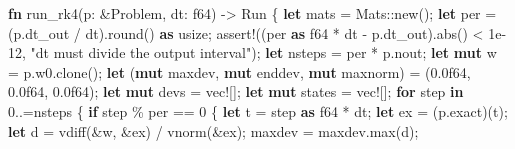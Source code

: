 \documentclass[
  10pt,
]{article}
\newenvironment{Shaded}{}{}
\newcommand{\ControlFlowTok}[1]{\textcolor[rgb]{0.00,0.44,0.13}{\textbf{#1}}}
\newcommand{\DataTypeTok}[1]{\textcolor[rgb]{0.56,0.13,0.00}{#1}}
\newcommand{\DecValTok}[1]{\textcolor[rgb]{0.25,0.63,0.44}{#1}}
\newcommand{\KeywordTok}[1]{\textcolor[rgb]{0.00,0.44,0.13}{\textbf{#1}}}
\newcommand{\NormalTok}[1]{#1}
\newcommand{\OperatorTok}[1]{\textcolor[rgb]{0.40,0.40,0.40}{#1}}
\newcommand{\PreprocessorTok}[1]{\textcolor[rgb]{0.74,0.48,0.00}{#1}}
\newcommand{\StringTok}[1]{\textcolor[rgb]{0.25,0.44,0.63}{#1}}
\begin{document}
\begin{Shaded}
\begin{Highlighting}[]
\KeywordTok{fn}\NormalTok{ run\_rk4(p}\OperatorTok{:} \OperatorTok{\&}\NormalTok{Problem}\OperatorTok{,}\NormalTok{ dt}\OperatorTok{:} \DataTypeTok{f64}\NormalTok{) }\OperatorTok{{-}\textgreater{}}\NormalTok{ Run }\OperatorTok{\{}
    \KeywordTok{let}\NormalTok{ mats }\OperatorTok{=} \PreprocessorTok{Mats::}\NormalTok{new()}\OperatorTok{;}
    \KeywordTok{let}\NormalTok{ per }\OperatorTok{=}\NormalTok{ (p}\OperatorTok{.}\NormalTok{dt\_out }\OperatorTok{/}\NormalTok{ dt)}\OperatorTok{.}\NormalTok{round() }\KeywordTok{as} \DataTypeTok{usize}\OperatorTok{;}
    \PreprocessorTok{assert!}\NormalTok{((per }\KeywordTok{as} \DataTypeTok{f64} \OperatorTok{*}\NormalTok{ dt }\OperatorTok{{-}}\NormalTok{ p}\OperatorTok{.}\NormalTok{dt\_out)}\OperatorTok{.}\NormalTok{abs() }\OperatorTok{\textless{}} \DecValTok{1e{-}12}\OperatorTok{,} \StringTok{"dt must divide the output interval"}\NormalTok{)}\OperatorTok{;}
    \KeywordTok{let}\NormalTok{ nsteps }\OperatorTok{=}\NormalTok{ per }\OperatorTok{*}\NormalTok{ p}\OperatorTok{.}\NormalTok{nout}\OperatorTok{;}
    \KeywordTok{let} \KeywordTok{mut}\NormalTok{ w }\OperatorTok{=}\NormalTok{ p}\OperatorTok{.}\NormalTok{w0}\OperatorTok{.}\NormalTok{clone()}\OperatorTok{;}
    \KeywordTok{let}\NormalTok{ (}\KeywordTok{mut}\NormalTok{ maxdev}\OperatorTok{,} \KeywordTok{mut}\NormalTok{ enddev}\OperatorTok{,} \KeywordTok{mut}\NormalTok{ maxnorm) }\OperatorTok{=}\NormalTok{ (}\DecValTok{0.0f64}\OperatorTok{,} \DecValTok{0.0f64}\OperatorTok{,} \DecValTok{0.0f64}\NormalTok{)}\OperatorTok{;}
    \KeywordTok{let} \KeywordTok{mut}\NormalTok{ devs }\OperatorTok{=} \PreprocessorTok{vec!}\NormalTok{[]}\OperatorTok{;}
    \KeywordTok{let} \KeywordTok{mut}\NormalTok{ states }\OperatorTok{=} \PreprocessorTok{vec!}\NormalTok{[]}\OperatorTok{;}
    \ControlFlowTok{for}\NormalTok{ step }\KeywordTok{in} \DecValTok{0}\OperatorTok{..=}\NormalTok{nsteps }\OperatorTok{\{}
        \ControlFlowTok{if}\NormalTok{ step }\OperatorTok{\%}\NormalTok{ per }\OperatorTok{==} \DecValTok{0} \OperatorTok{\{}
            \KeywordTok{let}\NormalTok{ t }\OperatorTok{=}\NormalTok{ step }\KeywordTok{as} \DataTypeTok{f64} \OperatorTok{*}\NormalTok{ dt}\OperatorTok{;}
            \KeywordTok{let}\NormalTok{ ex }\OperatorTok{=}\NormalTok{ (p}\OperatorTok{.}\NormalTok{exact)(t)}\OperatorTok{;}
            \KeywordTok{let}\NormalTok{ d }\OperatorTok{=}\NormalTok{ vdiff(}\OperatorTok{\&}\NormalTok{w}\OperatorTok{,} \OperatorTok{\&}\NormalTok{ex) }\OperatorTok{/}\NormalTok{ vnorm(}\OperatorTok{\&}\NormalTok{ex)}\OperatorTok{;}
\NormalTok{            maxdev }\OperatorTok{=}\NormalTok{ maxdev}\OperatorTok{.}\NormalTok{max(d)}\OperatorTok{;}

\end{Highlighting}
\end{Shaded}
\end{document}
